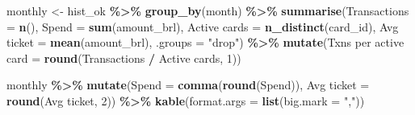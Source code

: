 \documentclass[
]{article}
\newenvironment{Shaded}{\begin{snugshade}}{\end{snugshade}}
\newcommand{\AttributeTok}[1]{\textcolor[rgb]{0.13,0.29,0.53}{#1}}
\newcommand{\DecValTok}[1]{\textcolor[rgb]{0.00,0.00,0.81}{#1}}
\newcommand{\FunctionTok}[1]{\textcolor[rgb]{0.13,0.29,0.53}{\textbf{#1}}}
\newcommand{\NormalTok}[1]{#1}
\newcommand{\OtherTok}[1]{\textcolor[rgb]{0.56,0.35,0.01}{#1}}
\newcommand{\SpecialCharTok}[1]{\textcolor[rgb]{0.81,0.36,0.00}{\textbf{#1}}}
\newcommand{\StringTok}[1]{\textcolor[rgb]{0.31,0.60,0.02}{#1}}
\begin{document}
\begin{Shaded}
\begin{Highlighting}[]
\NormalTok{monthly }\OtherTok{\textless{}{-}}\NormalTok{ hist\_ok }\SpecialCharTok{\%\textgreater{}\%} \FunctionTok{group\_by}\NormalTok{(month) }\SpecialCharTok{\%\textgreater{}\%}
  \FunctionTok{summarise}\NormalTok{(}\AttributeTok{Transactions =} \FunctionTok{n}\NormalTok{(), }\AttributeTok{Spend =} \FunctionTok{sum}\NormalTok{(amount\_brl),}
            \StringTok{\textasciigrave{}}\AttributeTok{Active cards}\StringTok{\textasciigrave{}} \OtherTok{=} \FunctionTok{n\_distinct}\NormalTok{(card\_id),}
            \StringTok{\textasciigrave{}}\AttributeTok{Avg ticket}\StringTok{\textasciigrave{}} \OtherTok{=} \FunctionTok{mean}\NormalTok{(amount\_brl), }\AttributeTok{.groups =} \StringTok{"drop"}\NormalTok{) }\SpecialCharTok{\%\textgreater{}\%}
  \FunctionTok{mutate}\NormalTok{(}\StringTok{\textasciigrave{}}\AttributeTok{Txns per active card}\StringTok{\textasciigrave{}} \OtherTok{=} \FunctionTok{round}\NormalTok{(Transactions }\SpecialCharTok{/} \StringTok{\textasciigrave{}}\AttributeTok{Active cards}\StringTok{\textasciigrave{}}\NormalTok{, }\DecValTok{1}\NormalTok{))}

\NormalTok{monthly }\SpecialCharTok{\%\textgreater{}\%} \FunctionTok{mutate}\NormalTok{(}\AttributeTok{Spend =} \FunctionTok{comma}\NormalTok{(}\FunctionTok{round}\NormalTok{(Spend)), }\StringTok{\textasciigrave{}}\AttributeTok{Avg ticket}\StringTok{\textasciigrave{}} \OtherTok{=} \FunctionTok{round}\NormalTok{(}\StringTok{\textasciigrave{}}\AttributeTok{Avg ticket}\StringTok{\textasciigrave{}}\NormalTok{, }\DecValTok{2}\NormalTok{)) }\SpecialCharTok{\%\textgreater{}\%}
  \FunctionTok{kable}\NormalTok{(}\AttributeTok{format.args =} \FunctionTok{list}\NormalTok{(}\AttributeTok{big.mark =} \StringTok{","}\NormalTok{))}
\end{Highlighting}
\end{Shaded}
\end{document}

